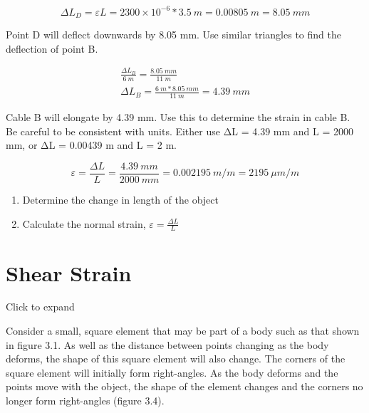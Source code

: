 \documentclass[
  letterpaper,
  DIV=11,
  numbers=noendperiod]{scrreprt}
\providecommand{\tightlist}{%
  \setlength{\itemsep}{0pt}\setlength{\parskip}{0pt}}\usepackage{longtable,booktabs,array}
\begin{document}
\begin{tcolorbox}
\begin{tcolorbox}
\[
\Delta L_D=\varepsilon L=2300 \times 10^{-6} * 3.5{~m}=0.00805 {~m}=8.05 {~mm}
\]

Point D will deflect downwards by 8.05 mm. Use similar triangles to find
the deflection of point B.

\[
\begin{gathered}
\frac{\Delta L_B}{6{~m}}=\frac{8.05{~mm}}{11{~m}} \\
\Delta L_B=\frac{6{~m} * 8.05{~mm}}{11{~m}}=4.39{~mm}
\end{gathered}
\]

Cable B will elongate by 4.39 mm. Use this to determine the strain in
cable B. Be careful to be consistent with units. Either use ΔL = 4.39 mm
and L = 2000 mm, or ΔL = 0.00439 m and L = 2 m.

\[
\varepsilon=\frac{\Delta L}{L}=\frac{4.39{~mm}}{2000{~mm}}=0.002195{~m}/{m}=2195 ~\mu{m} /{m}
\]

\end{tcolorbox}

\end{tcolorbox}

\begin{tcolorbox}[enhanced jigsaw, breakable, opacityback=0, toptitle=1mm, left=2mm, colback=white, opacitybacktitle=0.6, colframe=quarto-callout-warning-color-frame, titlerule=0mm, arc=.35mm, leftrule=.75mm, bottomtitle=1mm, colbacktitle=quarto-callout-warning-color!10!white, rightrule=.15mm, title={Step-by-step: Normal strain}, bottomrule=.15mm, toprule=.15mm, coltitle=black]

\begin{enumerate}
\def\labelenumi{\arabic{enumi}.}
\tightlist
\item
  Determine the change in length of the object
\item
  Calculate the normal strain, \(\varepsilon=\frac{\Delta L}{L}\)
\end{enumerate}

\end{tcolorbox}

\section{Shear Strain}\label{sec-3.2}

Click to expand

Consider a small, square element that may be part of a body such as that
shown in figure 3.1. As well as the distance between points changing as
the body deforms, the shape of this square element will also change. The
corners of the square element will initially form right-angles. As the
body deforms and the points move with the object, the shape of the
element changes and the corners no longer form right-angles (figure
3.4).
\end{document}
